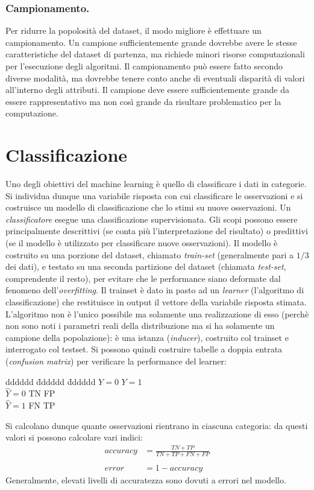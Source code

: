 \documentclass[11pt, a4page, twocolumn]{article}
\begin{document}
\section{Campionamento.}
Per ridurre la popolosità del dataset, il modo migliore è effettuare un campionamento.
Un campione sufficientemente grande dovrebbe avere le stesse caratteristiche del dataset di partenza, ma richiede minori risorse computazionali per l'esecuzione degli algoritmi.
Il campionamento può essere fatto secondo diverse modalità, ma dovrebbe tenere conto anche di eventuali disparità di valori all'interno degli attributi.
Il campione deve essere sufficientemente grande da essere rappresentativo ma non così grande da risultare problematico per la computazione.



\newpage
\part{Classificazione}
Uno degli obiettivi del machine learning è quello di classificare i dati in categorie.
Si individua dunque una variabile risposta con cui classificare le osservazioni e si costruisce un modello di classificazione che lo stimi su nuove osservazioni.
Un \textit{classificatore} esegue una classificazione supervisionata.
Gli scopi possono essere principalmente descrittivi (se conta più l'interpretazione del risultato) o predittivi (se il modello è utilizzato per classificare nuove osservazioni).
Il modello è costruito su una porzione del dataset, chiamato \textit{train-set} (generalmente pari a $1/3$ dei dati), e testato su una seconda partizione del dataset (chiamata \textit{test-set}, comprendente il resto), per evitare che le performance siano deformate dal fenomeno dell'\textit{overfitting}.
Il trainset è dato in pasto ad un \textit{learner} (l'algoritmo di classificazione) che restituisce in output il vettore della variabile risposta stimata.
L'algoritmo non è l'unico possibile ma solamente una realizzazione di esso (perchè non sono noti i parametri reali della distribuzione ma si ha solamente un campione della popolazione): è una istanza (\textit{inducer}), costruito col trainset e interrogato col testset.
Si possono quindi costruire tabelle a doppia entrata (\textit{confusion matrix}) per verificare la performance del learner:
\begin{tabbing}
  dddddd \= dddddd \= dddddd \kill
              \> $Y=0$ \> $Y=1$   \\
  $\hat{Y}=0$ \> TN    \> FP      \\
  $\hat{Y}=1$ \> FN    \> TP      \\
\end{tabbing}
Si calcolano dunque quante osservazioni rientrano in ciascuna categoria: da questi valori si possono calcolare vari indici:
\begin{align*}
  accuracy &= \frac{TN + TP}{TN + TP + FN + FP} \\  \\
  error &= 1 - accuracy
\end{align*}
Generalmente, elevati livelli di accuratezza sono dovuti a errori nel modello.
\end{document}
